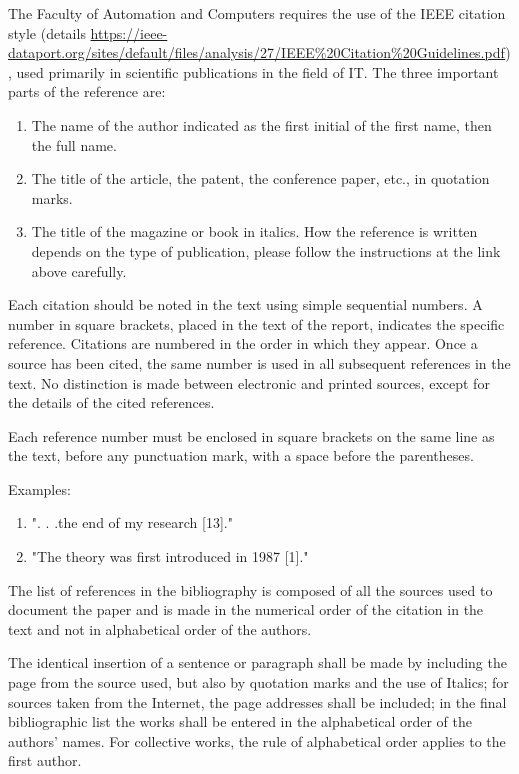 The Faculty of Automation and Computers requires the use of the IEEE citation style (details \url{https://ieee-dataport.org/sites/default/files/analysis/27/IEEE\%20Citation\%20Guidelines.pdf}), used primarily in scientific publications in the field of IT. The three important parts of the reference are:
\begin{enumerate}[leftmargin=2cm,topsep=1.15pt,itemsep=1.15pt,partopsep=1.15pt,parsep=1.15pt,label=\alph*.]
   \item The name of the author indicated as the first initial of the first name, then the full name.
   \item The title of the article, the patent, the conference paper, etc., in quotation marks.
   \item The title of the magazine or book in italics.
How the reference is written depends on the type of publication, please follow the instructions at the link above carefully.
\end{enumerate}
	 
Each citation should be noted in the text using simple sequential numbers. A number in square brackets, placed in the text of the report, indicates the specific reference. Citations are numbered in the order in which they appear. Once a source has been cited, the same number is used in all subsequent references in the text. No distinction is made between electronic and printed sources, except for the details of the cited references.


Each reference number must be enclosed in square brackets on the same line as the text, before any punctuation mark, with a space before the parentheses.

Examples:
\begin{enumerate}[leftmargin=2cm,topsep=1.15pt,itemsep=1.15pt,partopsep=1.15pt,parsep=1.15pt,label=\alph*.]
   \item ". . .the end of my research [13]."
   \item "The theory was first introduced in 1987 [1]."
\end{enumerate}

The list of references in the bibliography is composed of all the sources used to document the paper and is made in the numerical order of the citation in the text and not in alphabetical order of the authors.

The identical insertion of a sentence or paragraph shall be made by including the page from the source used, but also by quotation marks and the use of Italics; for sources taken from the Internet, the page addresses shall be included; in the final bibliographic list the works shall be entered in the alphabetical order of the authors' names. For collective works, the rule of alphabetical order applies to the first author. 

